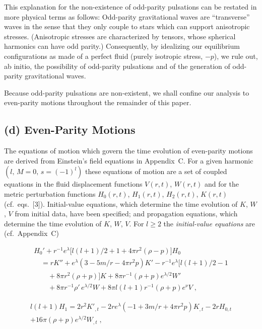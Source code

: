 This explanation for the non-existence of odd-parity pulsations can be restated in
more physical terms as follows: Odd-parity gravitational waves are ``transverse'' waves
in the sense that they only couple to stars which can support anisotropic stresses.
(Anisotropic stresses are characterized by tensors, whose spherical harmonics can have
odd parity.) Consequently, by idealizing our equilibrium configurations as made of a
perfect fluid (purely isotropic stress, $-p$), we rule out, ab initio, the possibility of
odd-parity pulsations and of the generation of odd-parity gravitational waves.

Because odd-parity pulsations are non-existent, we shall confine our analysis to
even-parity motions throughout the remainder of this paper.

\subsection*{(d) Even-Parity Motions}

The equations of motion which govern the time evolution of even-parity motions are
derived from Einstein's field equations in Appendix~C\@. For a given harmonic
$(l,\,M=0,\,s=(-1)^{l})$ these equations of motion are a set of coupled equations in the
fluid displacement functions $V(r,t)$, $W(r,t)$ and for the metric perturbation functions
$H_0(r,t)$, $H_1(r,t)$, $H_2(r,t)$, $K(r,t)$ (cf.\ eqs.\ [3]). Initial-value equations, which
determine the time evolution of $K$, $W$, $V$ from initial data, have been specified; and
propagation equations, which determine the time evolution of $K$, $W$, $V$. For $l\geq 2$
the \emph{initial-value equations} are (cf.\ Appendix~C)

\begin{equation}
\begin{split}
H_0' + r^{-1}e^{\lambda}\bigl[l(l+1)/2 + 1 + 4\pi r^2(\rho-p)\bigr]H_0 \\
\quad = rK'' + e^{\lambda}(3-5m/r-4\pi r^2 p)K'
  - r^{-1}e^{\lambda}\bigl[l(l+1)/2 - 1 \\
\qquad + 8\pi r^2(\rho+p)\bigr]K
  + 8\pi r^{-1}(\rho+p)e^{\lambda/2}W' \\
\qquad + 8\pi r^{-1}\rho'\,e^{\lambda/2}W
  + 8\pi l(l+1)r^{-1}(\rho+p)e^{\nu}V \;,
\end{split}
\tag{8a}
\end{equation}

\begin{equation}
\begin{split}
l(l+1)H_1 = 2r^2 K'_{,t} - 2re^{\lambda}(-1+3m/r+4\pi r^2 p)K_{,t}
  - 2rH_{0,t} \\
  + 16\pi(\rho+p)e^{\lambda/2}W_{,t} \;,
\end{split}
\tag{8b}
\end{equation}

